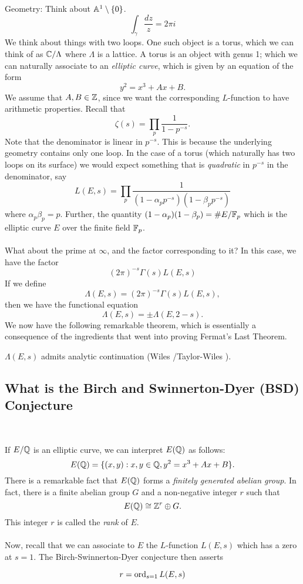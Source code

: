 \documentclass[12pt,amsfont]{amsart}
\begin{document}
Geometry: Think about $\mathbb{A}^1 \setminus \{0\}$. 
\[\int_\gamma \frac{dz}{z} = 2 \pi i\]
We think about things with two loops. One such object is a torus, which we can think of as ${\mathbb C}/\Lambda$ where $\Lambda$ is a lattice. A torus is an object with genus 1; which we can naturally associate to an \emph{elliptic curve}, which is given by an equation of the form
\[y^2 = x^3 + Ax + B. \]
We assume that $A,B \in {\mathbb Z}$, since we want the corresponding $L$-function to have arithmetic properties. Recall that
\[\zeta(s) = \prod_p \frac{1}{1 - p^{-s}}.\]
Note that the denominator is linear in $p^{-s}$. This is because the underlying geometry contains only one loop. In the case of a torus (which naturally has two loops on its surface) we would expect something that is \emph{quadratic} in $p^{-s}$ in the denominator, say
\[L(E,s) = \prod_p \frac{1}{(1 - \alpha_p p^{-s})(1 - \beta_p p^{-s})} \]
where $\alpha_p \beta_p = p$. Further, the quantity $(1 - \alpha_p)(1 - \beta_p) = \#E / {\mathbb F}_p$ which is the elliptic curve $E$ over the finite field ${\mathbb F}_p$. \\ \\
What about the prime at $\infty$, and the factor corresponding to it? In this case, we have the factor
\[(2\pi)^{-s} \Gamma(s) L(E,s) \]
If we define
\[\Lambda(E,s) = (2\pi)^{-s} \Gamma(s) L(E,s), \]
then we have the functional equation
\[\Lambda(E,s) = \pm \Lambda(E,2-s).\]
We now have the following remarkable theorem, which is essentially a consequence of the ingredients that went into proving Fermat's Last Theorem.
\begin{thm} $\Lambda(E,s)$ admits analytic continuation (Wiles /Taylor-Wiles ).
\end{thm}


\subsection{What is the Birch and Swinnerton-Dyer (BSD) Conjecture}
{\ }

If $E/{\mathbb Q}$ is an elliptic curve, we can interpret $E({\mathbb Q})$ as follows:
\[E({\mathbb Q}) = \{(x,y) : x,y \in {\mathbb Q}, y^2 = x^3 + Ax + B\}.\]
There is a remarkable fact that $E({\mathbb Q})$ forms a \emph{finitely generated abelian group}. In fact, there is a finite abelian group $G$ and a non-negative integer $r$ such that
\[E({\mathbb Q}) \cong {\mathbb Z}^r \oplus G.\]
This integer $r$ is called the \emph{rank} of $E$. \\ \\
Now, recall that we can associate to $E$ the $L$-function $L(E,s)$ which has a zero at $s = 1$. The Birch-Swinnerton-Dyer conjecture then asserts
\begin{cnj} \[r = \operatorname{ord}_{s=1} L(E,s)\]
\end{cnj}
\end{document}
